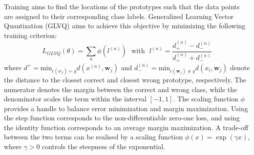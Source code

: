 \documentclass{esannV2}
\begin{document}
Training aims to find the locations of the prototypes such that the data points are assigned to their corresponding class labels. Generalized Learning Vector Quantization (GLVQ) \cite{sato1996generalized} aims to achieve this objective by minimizing the following training criterion:
\begin{equation}
 L_{GLVQ}(\theta) = \sum_n \phi(l^{(n)}) \mbox{~~with~~} l^{(n)} = \frac{d^{(n)}_+ - d^{(n)}_-}{d^{(n)}_+ + d^{(n)}_-}
\end{equation}
where $d^+ = \mbox{min}_{c(w_j) = y} d(x^{(n)}, \mathbf{w}_j)$ and $d^{(n)}_- = \mbox{min}_{c(\mathbf{w}_j)\neq y} d(x_i, \mathbf{w}_j)$ denote the distance to the closest correct and closest wrong prototype, respectively. The numerator denotes the margin between the correct and wrong class, while the denominator scales the term within the interval $[-1, 1]$. The scaling function $\phi$ provides a handle to balance error minimization and margin maximization. Using the step function corresponds to the non-differentiable zero-one loss, and using the identity function corresponds to an average margin maximization. A trade-off between the two terms can be realised by a scaling function $\phi(x) = \exp(\gamma x)$, where $\gamma > 0$ controls the steepness of the exponential. 
\end{document}
